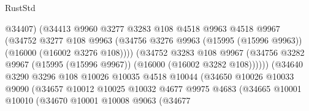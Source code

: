 \begin{lexlean}{RustStd}
\begin{coremodule}
                                      @34407)
                                    (@34413
                                      @9960
                                      @3277
                                      @3283
                                      @108
                                      @4518
                                      @9963
                                      @4518
                                      @9967
                                      (@34752
                                        @3277
                                        @108
                                        @9963
                                        (@34756
                                          @3276
                                          @9963
                                          (@15995 (@15996 @9963))
                                          (@16000 (@16002 @3276 @108))))
                                      (@34752
                                        @3283
                                        @108
                                        @9967
                                        (@34756
                                          @3282
                                          @9967
                                          (@15995 (@15996 @9967))
                                          (@16000 (@16002 @3282 @108))))))
                                  (@34640
                                    @3290
                                    @3296
                                    @108
                                    @10026
                                    @10035
                                    @4518
                                    @10044
                                    (@34650
                                      @10026
                                      @10033
                                      @9090
                                      (@34657
                                        @10012
                                        @10025
                                        @10032
                                        @4677
                                        @9975
                                        @4683
                                        (@34665
                                          @10001
                                          @10010
                                          (@34670
                                            @10001
                                            @10008
                                            @9063
                                            (@34677

\end{coremodule}
\end{lexlean}
